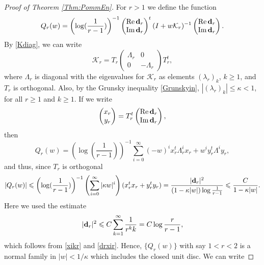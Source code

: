 \documentclass{article}
\numberwithin{equation}{section}
\numberwithin{figure}{section}
\theoremstyle{plain}
\theoremstyle{plain}
\numberwithin{thm}{section}
\theoremstyle{remark}
\newcommand{\re}{\text{{\rm Re}\,}}
\newcommand{\im}{\text{{\rm Im}\,}}
\let \le \leqslant
\let \ge \geqslant
\begin{document}
\begin{proof}[Proof of Theorem \ref{Thm:PommEn}]
For $r>1$ we define the function
 \begin{equation*}
Q_r(w)=\left(\log(\frac 1{r-1})\right)^{-1}\begin{pmatrix}
     \re {\bf d}_r \\ \im {\bf d}_r
 \end{pmatrix} ^t(I+w \mathcal{K}_r)^{-1} 
\begin{pmatrix}
     \re {\bf d}_r \\ \im {\bf d}_r
 \end{pmatrix}.
 \end{equation*}  
By \eqref{Kdiag}, we can write
\begin{equation*}
\mathcal{K}_r=T_r\begin{pmatrix}
    \Lambda_r & 0 \\  0 & -\Lambda_r
    \end{pmatrix}T_r^t,
\end{equation*}
where $\Lambda_r$ is diagonal with the eigenvalues for $\mathcal{K}_r$ as elements $(\lambda_r)_k$, $k\ge 1$, and $T_r$ is orthogonal. Also, by the Grunsky inequality \eqref{Grunskyin}, $|(\lambda_r)_k|\le\kappa<1$, for all $r\ge 1$ and $k\ge 1$. If we write
\begin{equation*}
\begin{pmatrix}
    x_r \\ y_r
\end{pmatrix}=T_r^t\begin{pmatrix}
     \re {\bf d}_r \\ \im {\bf d}_r
 \end{pmatrix},
 \end{equation*}
then
\begin{equation*}
    Q_r(w)=\left(\log(\frac 1{r-1})\right)^{-1}\sum_{i=0}^\infty (-w)^ix_r^t\Lambda_r^ix_r+w^iy_r^t\Lambda^iy_r,
\end{equation*}
and thus, since $T_r$ is orthogonal
\begin{equation*}
    |Q_r(w)|\le \left(\log(\frac 1{r-1})\right)^{-1}\left(\sum_{i=0}^\infty |\kappa w|^i\right)(x_r^tx_r+y_r^ty_r)=\frac{|{\bf d}_r|^2}{(1-\kappa|w|)\log\frac 1{r-1}}\le \frac C{1-\kappa|w|}.
\end{equation*}
Here we used the estimate
\begin{equation*}
    |{\bf d}_r|^2\le C\sum_{k=1}^\infty \frac 1{r^k k}= C\log\frac r{r-1},
\end{equation*}
which follows from \eqref{xikr} and \eqref{drxir}. Hence, $\{Q_r(w)\}$ with say $1<r<2$ is a normal family in $|w|<1/\kappa$ which includes the closed unit disc. We can write

\end{proof}
\end{document}
